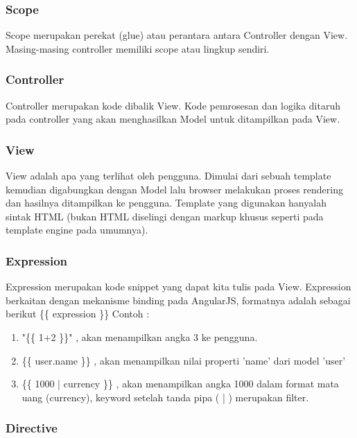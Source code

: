 \subsubsection{Scope}
\label{sub: Scope}

	Scope merupakan perekat (glue) atau perantara antara Controller dengan View. Masing-masing controller memiliki scope atau lingkup sendiri.
	
\subsubsection{Controller}
\label{subsub: controller}

	Controller merupakan kode dibalik View. Kode pemrosesan dan logika ditaruh pada controller yang akan menghasilkan Model untuk ditampilkan pada View.

\subsubsection{View}
\label{subsub: view}

	View adalah apa yang terlihat oleh pengguna. Dimulai dari sebuah template kemudian digabungkan dengan Model lalu browser melakukan proses rendering dan hasilnya ditampilkan ke pengguna. Template yang digunakan hanyalah sintak HTML (bukan HTML diselingi dengan markup khusus seperti pada template engine pada umumnya).

\subsubsection{Expression}
\label{subsub: expression}

	Expression merupakan kode snippet yang dapat kita tulis pada View. Expression berkaitan dengan mekanisme binding pada AngularJS, formatnya adalah sebagai berikut \{\{ expression \}\} Contoh :
	
	\begin{enumerate}
		\item "\{\{ 1+2 \}\}" , akan menampilkan angka 3 ke pengguna.
		\item \{\{ user.name \}\} , akan menampilkan nilai properti 'name' dari model 'user'
		\item \{\{ 1000 | currency \}\} , akan menampilkan angka 1000 dalam format mata uang (currency), keyword setelah tanda pipa ( | ) merupakan filter.
	\end{enumerate}

\subsubsection{Directive}
\label{subsub: directive}

